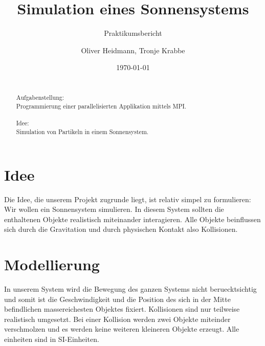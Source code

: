 \title{Simulation eines Sonnensystems}
\subtitle{Praktikumsbericht}

\author{Oliver Heidmann, Tronje Krabbe}

  
\date{\today}

\maketitle

\newpage
\begin{abstract}
\quad \\
Aufgabenstellung: \\
Programmierung einer parallelisierten Applikation mittels MPI. \\ \\
Idee: \\
Simulation von Partikeln in einem Sonnensystem.
\end{abstract}

\tableofcontents
\newpage
\section{Idee}
Die Idee, die unserem Projekt zugrunde liegt, ist relativ simpel zu formulieren:
Wir wollen ein Sonnensystem simulieren. In diesem System sollten die enthaltenen
Objekte realistisch miteinander interagieren. Alle Objekte beinflussen sich durch
die Gravitation und durch physischen Kontakt also Kollisionen. 

\section{Modellierung}
In unserem System
wird die Bewegung des ganzen Systems nicht beruecktsichtig und somit ist die 
Geschwindigkeit und die Position des sich in der Mitte befindlichen massereichesten
Objektes fixiert.
Kollisionen sind nur teilweise realistisch umgesetzt. Bei einer Kollision werden
zwei Objekte miteinder verschmolzen und es werden keine weiteren kleineren Objekte
erzeugt.
Alle einheiten sind in SI-Einheiten.


